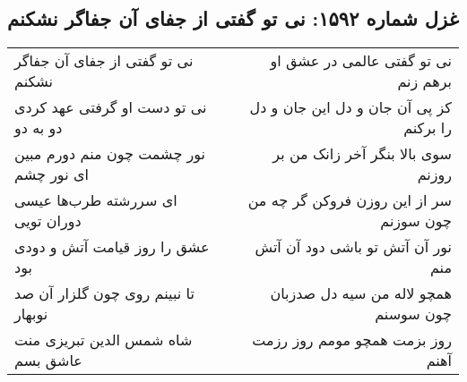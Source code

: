 \begin{center}
\section*{غزل شماره ۱۵۹۲: نی تو گفتی از جفای آن جفاگر نشکنم}
\label{sec:1592}
\begin{longtable}{l p{0.5cm} r}
نی تو گفتی از جفای آن جفاگر نشکنم
&&
نی تو گفتی عالمی در عشق او برهم زنم
\\
نی تو دست او گرفتی عهد کردی دو به دو
&&
کز پی آن جان و دل این جان و دل را برکنم
\\
نور چشمت چون منم دورم مبین ای نور چشم
&&
سوی بالا بنگر آخر زانک من بر روزنم
\\
ای سررشته طرب‌ها عیسی دوران تویی
&&
سر از این روزن فروکن گر چه من چون سوزنم
\\
عشق را روز قیامت آتش و دودی بود
&&
نور آن آتش تو باشی دود آن آتش منم
\\
تا نبینم روی چون گلزار آن صد نوبهار
&&
همچو لاله من سیه دل صدزبان چون سوسنم
\\
شاه شمس الدین تبریزی منت عاشق بسم
&&
روز بزمت همچو مومم روز رزمت آهنم
\\
\end{longtable}
\end{center}
